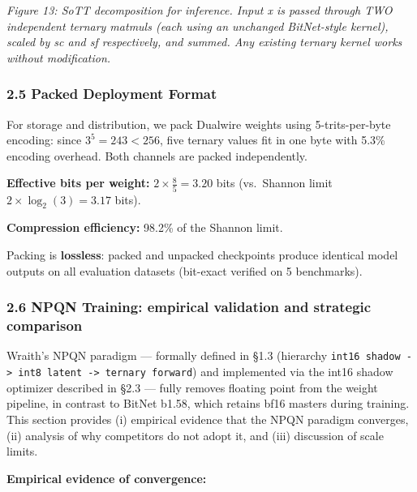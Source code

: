 \emph{Figure 13: SoTT decomposition for inference. Input x is passed
through TWO independent ternary matmuls (each using an unchanged
BitNet-style kernel), scaled by sc and sf respectively, and summed. Any
existing ternary kernel works without modification.}

\subsubsection{2.5 Packed Deployment
Format}\label{packed-deployment-format}

For storage and distribution, we pack Dualwire weights using
5-trits-per-byte encoding: since \(3^5 = 243 < 256\), five ternary
values fit in one byte with 5.3\% encoding overhead. Both channels are
packed independently.

\textbf{Effective bits per weight:} \(2 \times \frac{8}{5} = 3.20\) bits
(vs.~Shannon limit \(2 \times \log_2(3) = 3.17\) bits).

\textbf{Compression efficiency:} 98.2\% of the Shannon limit.

Packing is \textbf{lossless}: packed and unpacked checkpoints produce
identical model outputs on all evaluation datasets (bit-exact verified
on 5 benchmarks).

\subsubsection{2.6 NPQN Training: empirical validation and strategic
comparison}\label{npqn-training-empirical-validation-and-strategic-comparison}

Wraith's NPQN paradigm --- formally defined in §1.3 (hierarchy
\texttt{int16\ shadow\ ->\ int8\ latent\ ->\ ternary\ forward}) and
implemented via the int16 shadow optimizer described in §2.3 --- fully
removes floating point from the weight pipeline, in contrast to BitNet
b1.58, which retains bf16 masters during training. This section provides
(i) empirical evidence that the NPQN paradigm converges, (ii) analysis
of why competitors do not adopt it, and (iii) discussion of scale
limits.

\textbf{Empirical evidence of convergence:}

